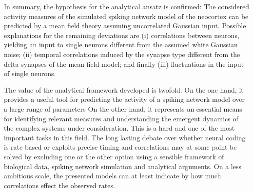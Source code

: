 
In summary, the hypothesis for the analytical ansatz is confirmed: 
The considered activity measures of the simulated spiking network model of the neocortex 
can be predicted by a mean field theory assuming uncorrelated Gaussian input.
Possible explanations for the remaining deviations are (i) correlations between neurons, 
yielding an input to single neurons different from the assumed white Gaussian noise;
(ii) temporal correlations induced by the synapse type different from the 
delta synapses of the mean field model; and finally (iii) fluctuations in the 
input of single neurons. 

The value of the analytical framework developed is twofold: On the one hand, 
it provides a useful tool for predicting the activity of a spiking network model
over a large range of parameters 
On the other hand, it represents an
essential means for identifying relevant measures and understanding the emergent 
dynamics of the complex systems under consideration. This is a hard and one of the 
most important tasks in this field. 
The long lasting
debate over whether neural coding is rate based or exploits precise timing and correlations
may at some point be solved by
excluding one or the other option using a sensible framework
of biological data, spiking network simulation and analytical arguments. 
On a less ambitious scale, the presented models can at least indicate by how much 
correlations effect the observed rates. 

